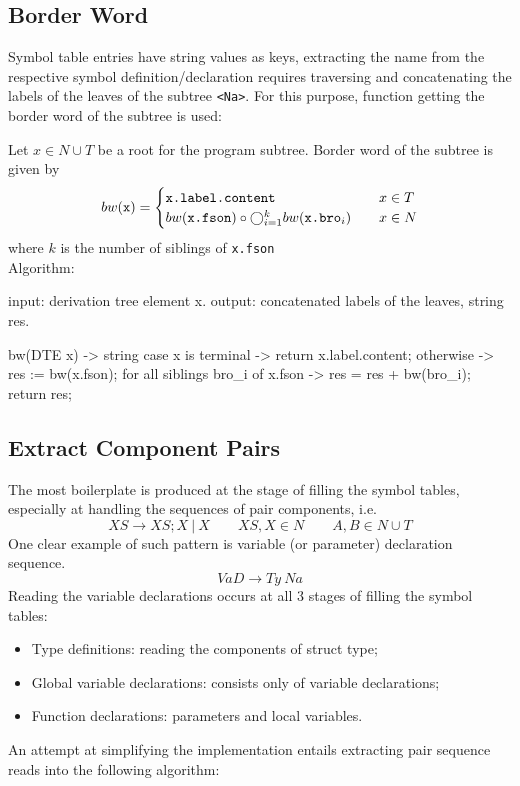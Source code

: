 \subsection{Border Word}\label{subsec:border-word}
Symbol table entries have string values as keys, extracting the name from the respective symbol definition/declaration
requires traversing and concatenating the labels of the leaves of the subtree \verb+<Na>+.
For this purpose, function getting the border word of the subtree is used:
\begin{definition}[bw]
    Let $x \in N \cup T$ be a root for the program subtree.
    Border word of the subtree is given by
    \[
        bw(\verb+x+) = \begin{cases}
                           \verb+x.label.content+&\quad x\in T\\
                           bw(\verb+x.fson+)\circ \bigcirc_{i=1}^k bw(\verb+x.bro+_i)&\quad x\in N
        \end{cases}
    \]
    where $k$ is the number of siblings of \verb+x.fson+\\
    Algorithm:
\end{definition}
\begin{codeblock}
    input: derivation tree element x.
    output: concatenated labels of the leaves, string res.

    bw(DTE x) -> string {
        case x is terminal -> return x.label.content;
        otherwise -> {
            res := bw(x.fson);
            for all siblings bro_i of x.fson -> {
                res = res + bw(bro_i);
            }
            return res;
        }
    }
\end{codeblock}

\subsection{Extract Component Pairs}\label{subsec:extract-component-pairs}
The most boilerplate is produced at the stage of filling the symbol tables, especially
at handling the sequences of pair components, i.e.
\[ XS \to XS; X\ |\ X\qquad XS,X \in N\qquad A,B\in N\cup T\]
One clear example of such pattern is variable (or parameter) declaration sequence.
\[ VaD \to Ty\ Na\]
Reading the variable declarations occurs at all 3 stages of filling the symbol tables:
\begin{itemize}
    \item Type definitions: reading the components of struct type;
    \item Global variable declarations: consists only of variable declarations;
    \item Function declarations: parameters and local variables.
\end{itemize}
An attempt at simplifying the implementation entails extracting pair sequence reads
into the following algorithm:

